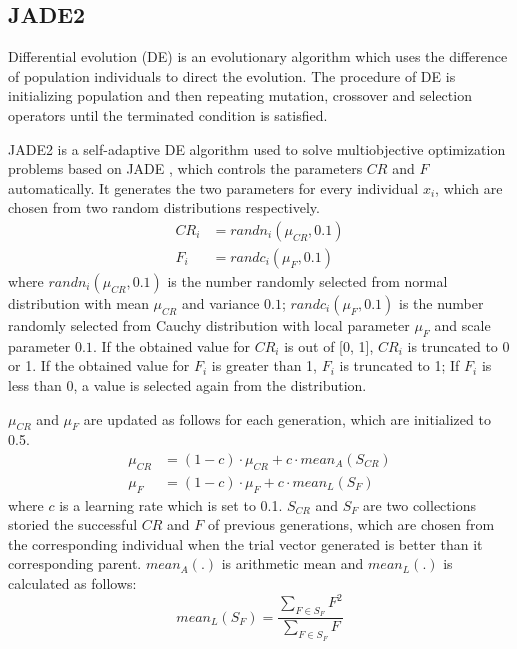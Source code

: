\documentclass[preprint,12pt]{elsarticle}
\begin{document}
\subsection{JADE2}
Differential evolution (DE) is an evolutionary algorithm which uses the difference of population individuals to direct the evolution.
The procedure of DE is initializing population and then repeating mutation, crossover and selection operators until the terminated condition is satisfied.

JADE2 \cite{Zhang2008} is a self-adaptive DE algorithm \cite{tanabe2013success,Zuo2021} used to solve multiobjective optimization problems based on JADE \cite{Zhang2009}, which controls the parameters $CR$ and $F$ automatically.
It generates the two parameters for every individual $x_i$, which are chosen from two random distributions respectively.
\begin{equation}
	\begin{aligned}
		CR_i & = randn_i(\mu_{CR}, 0.1) \\
		F_i  & = randc_i(\mu_F, 0.1)
	\end{aligned}
\end{equation}
where $randn_i(\mu_{CR}, 0.1)$ is the number randomly selected from normal distribution with mean $\mu_{CR}$ and variance $0.1$; $randc_i(\mu_F, 0.1)$ is the number randomly selected from Cauchy distribution with local parameter $\mu_F$ and scale parameter $0.1$.
If the obtained value for $CR_i$ is out of [0, 1], $CR_i$ is truncated to 0 or 1.
If the obtained value for $F_i$ is greater than 1, $F_i$ is truncated to 1;
If $F_i$ is less than 0, a value is selected again from the distribution.

$\mu_{CR}$ and $\mu_F$ are updated as follows for each generation, which are initialized to 0.5.
\begin{equation}
	\begin{aligned}
		\mu_{CR} & = (1-c) \cdot \mu_{CR} + c \cdot mean_A(S_{CR}) \\
		\mu_F    & = (1-c) \cdot \mu_F + c \cdot mean_L(S_F)
	\end{aligned}
\end{equation}
where $c$ is a learning rate which is set to 0.1.
$S_{CR}$ and $S_F$ are two collections storied the successful $CR$ and $F$ of previous generations, which are chosen from the corresponding individual when the trial vector generated is better than it corresponding parent.
$mean_A(.)$ is arithmetic mean and $mean_L(.)$ is calculated as follows:
\begin{equation}
	mean_L(S_F) = \frac{\sum_{F \in S_F}F^2}{\sum_{F \in S_F} F}
\end{equation}
\end{document}
